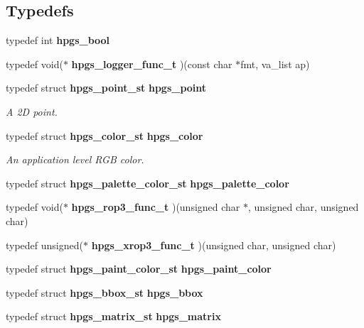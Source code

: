 \subsection*{Typedefs}
\begin{DoxyCompactItemize}
\item 
typedef int {\bfseries hpgs\_\-bool}\label{group__base_ga29a7aec912fb7a5ad0e82601a18b39ce}

\item 
typedef void($\ast$ {\bfseries hpgs\_\-logger\_\-func\_\-t} )(const char $\ast$fmt, va\_\-list ap)\label{group__base_ga563fc8cbc02904086ce0f3080c697db9}

\item 
typedef struct {\bf hpgs\_\-point\_\-st} {\bf hpgs\_\-point}
\begin{DoxyCompactList}\small\item\em A 2D point. \item\end{DoxyCompactList}\item 
typedef struct {\bf hpgs\_\-color\_\-st} {\bf hpgs\_\-color}
\begin{DoxyCompactList}\small\item\em An application level RGB color. \item\end{DoxyCompactList}\item 
typedef struct {\bf hpgs\_\-palette\_\-color\_\-st} {\bfseries hpgs\_\-palette\_\-color}\label{group__base_gade4e9715040c0819f79ca4f2efddf250}

\item 
typedef void($\ast$ {\bfseries hpgs\_\-rop3\_\-func\_\-t} )(unsigned char $\ast$, unsigned char, unsigned char)\label{group__base_ga764146c86d8ef0cd9adc8b6be930f872}

\item 
typedef unsigned($\ast$ {\bfseries hpgs\_\-xrop3\_\-func\_\-t} )(unsigned char, unsigned char)\label{group__base_ga972157f576ddf01954e520bbb7ec5498}

\item 
typedef struct {\bf hpgs\_\-paint\_\-color\_\-st} {\bfseries hpgs\_\-paint\_\-color}\label{group__base_gadb45ff83823a45567588dd72d29b91cd}

\item 
typedef struct {\bf hpgs\_\-bbox\_\-st} {\bfseries hpgs\_\-bbox}\label{group__base_ga0faf36b0ed91c6b5fb9b6df45e0df2aa}

\item 
typedef struct {\bf hpgs\_\-matrix\_\-st} {\bfseries hpgs\_\-matrix}\label{group__base_ga69971a93db7c8418772cdf2f064a9234}


\end{DoxyCompactItemize}
